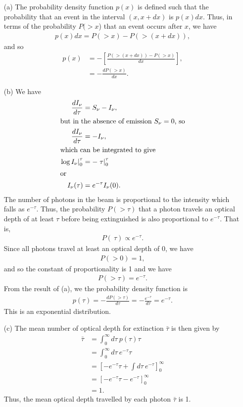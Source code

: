 \newslide

\problemset

\newslide

\begin{problem}
\begin{enumerate}
\item[(a)]
The probability density function $p(x)$ is defined such that  the probability that an event in the interval $(x,x+dx)$ is $p(x)dx$. Thus, in terms of the probability $P(>\!x$) that an event occurs after $x$, we have
\begin{align}
p(x)dx = P(>\!x) - P(>\!(x+dx)),
\end{align}
and so
\begin{align}
p(x) &= - \left[\frac{P(>\!(x+dx)) - P(>\!x)}{dx}\right],\\
&= - \frac{dP(>\!x)}{dx}.
\end{align}
\item[(b)]
We have
\begin{align}
\frac{dI_\nu}{d\tau}&= S_\nu - I_\nu,\\
\intertext{but in the absence of emission $S_\nu = 0$, so}
\frac{dI_\nu}{d\tau}&= - I_\nu,\\
\intertext{which can be integrated to give}
\left.\log I_\nu\right|_0^\tau &= -\left.\tau\right|_0^\tau\\
\intertext{or}
I_\nu(\tau) &= e^{-\tau}I_\nu(0).
\end{align}
The number of photons in the beam is proportional to the intensity which falls as $e^{-\tau}$. Thus, the probability $P(>\!\tau)$ that a photon travels an optical depth of at least $\tau$ before being extinguished is also proportional to $e^{-\tau}$. That is,
\begin{align}
P(\>\!\tau) \propto e^{-\tau}.
\end{align}
Since all photons travel at least an optical depth of 0, we have 
\begin{align}
P(>\!0) = 1,
\end{align}
and so the constant of proportionality is 1 and we have
\begin{align}
P(>\!\tau) = e^{-\tau}.
\end{align}
From the result of (a), we the probability density function is 
\begin{align}
p(\tau) = -\frac{dP(>\!\tau)}{d\tau} = -\frac{e^{-\tau}}{d\tau} = e^{-\tau}.
\end{align}
This is an exponential distribution.
\item[(c)]
The mean number of optical depth for extinction $\bar\tau$ is then given by
\begin{align}
\bar\tau &=  \int_{0}^\infty\!\!\!d\tau\:p(\tau)\tau\\
&=\int_{0}^\infty\!\!\!d\tau\:e^{-\tau}\tau\\
&=\left[-e^{-\tau}\tau + \int\!\!\!d\tau\:e^{-\tau}\right]_0^\infty\\
&=\left[-e^{-\tau}\tau -e^{-\tau}\right]_0^\infty\\
&=1.
\end{align}
Thus, the mean optical depth travelled by each photon $\bar\tau$ is 1.
\end{enumerate}
\end{problem}

